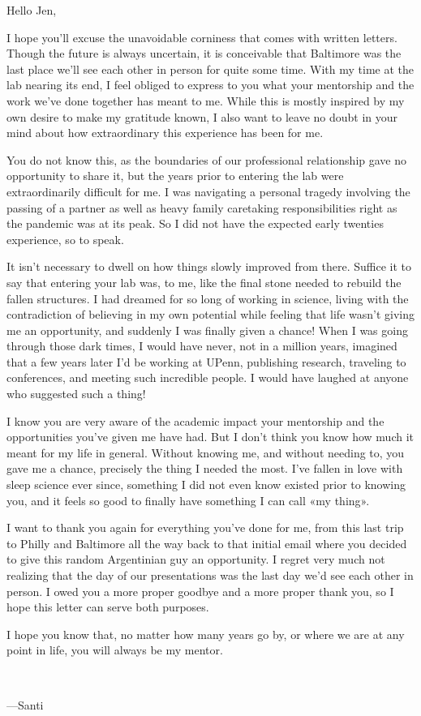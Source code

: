\documentclass[a4paper]{article}
\begin{document}
    

Hello Jen,

I hope you'll excuse the unavoidable corniness that comes with written letters.
Though the future is always uncertain, it is conceivable that Baltimore was the
last place we'll see each other in person for quite some time. With my time at
the lab nearing its end, I feel obliged to express to you what your mentorship
and the work we've done together has meant to me. While this is mostly inspired
by my own desire to make my gratitude known, I also want to leave no doubt in
your mind about how extraordinary this experience has been for me.

You do not know this, as the boundaries of our professional relationship gave
no opportunity to share it, but the years prior to entering the lab were
extraordinarily difficult for me. I was navigating a personal tragedy involving
the passing of a partner as well as heavy family caretaking responsibilities right
as the pandemic was at its peak. So I did not have the expected early twenties experience,
so to speak.

It isn't necessary to dwell on how things slowly improved from there. Suffice it
to say that entering your lab was, to me, like the final stone needed to rebuild
the fallen structures. I had dreamed for so long of working in science, living
with the contradiction of believing in my own potential while feeling that life
wasn't giving me an opportunity, and suddenly I was finally given a chance! When
I was going through those dark times, I would have never, not in a million
years, imagined that a few years later I'd be working at UPenn, publishing
research, traveling to conferences, and meeting such incredible people. I would
have laughed at anyone who suggested such a thing!

I know you are very aware of the academic impact your mentorship and the
opportunities you've given me have had. But I don't think you know how much it
meant for my life in general. Without knowing me, and without needing to, you
gave me a chance, precisely the thing I needed the most. I've fallen in love
with sleep science ever since, something I did not even know existed prior to
knowing you, and it feels so good to finally have something I can call «my
thing».

I want to thank you again for everything you've done for me, from this last trip
to Philly and Baltimore all the way back to that initial email where you decided
to give this random Argentinian guy an opportunity. I regret very much not
realizing that the day of our presentations was the last day we'd see each other
in person. I owed you a more proper goodbye and a more proper thank you, so I
hope this letter can serve both purposes.

I hope you know that, no matter how many years go by, or where we are at any
point in life, you will always be my mentor.

~

\newline
\newline
---Santi
\end{document}
